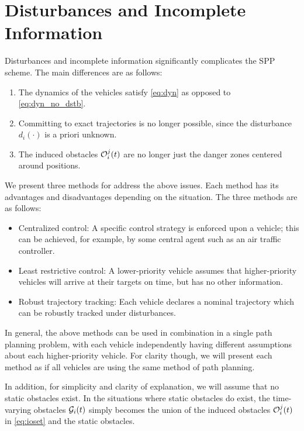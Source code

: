 \section{Disturbances and Incomplete Information \label{sec:obs_gen}}
Disturbances and incomplete information significantly complicates the SPP scheme. The main differences are as follows:

\begin{enumerate}
\item The dynamics of the vehicles satisfy \eqref{eq:dyn} as opposed to \eqref{eq:dyn_no_dstb}.
\item Committing to exact trajectories is no longer possible, since the disturbance $d_i(\cdot)$ is a priori unknown.
\item The induced obstacles $\mathcal{O}_i^j(t)$ are no longer just the danger zones centered around positions.
\end{enumerate}

We present three methods for address the above issues. Each method has its advantages and disadvantages depending on the situation. The three methods are as follows:
\begin{itemize}
\item Centralized control: A specific control strategy is enforced upon a vehicle; this can be achieved, for example, by some central agent such as an air traffic controller.
\item Least restrictive control: A lower-priority vehicle assumes that higher-priority vehicles will arrive at their targets on time, but has no other information.
\item Robust trajectory tracking: Each vehicle declares a nominal trajectory which can be robustly tracked under disturbances.
\end{itemize}

In general, the above methods can be used in combination in a single path planning problem, with each vehicle independently having different assumptions about each higher-priority vehicle. For clarity though, we will present each method as if all vehicles are using the same method of path planning.

In addition, for simplicity and clarity of explanation, we will assume that no static obstacles exist. In the situations where static obstacles do exist, the time-varying obstacles $\mathcal{G}_i(t)$ simply becomes the union of the induced obstacles $\mathcal{O}_i^j(t)$ in \eqref{eq:ioset} and the static obstacles.

